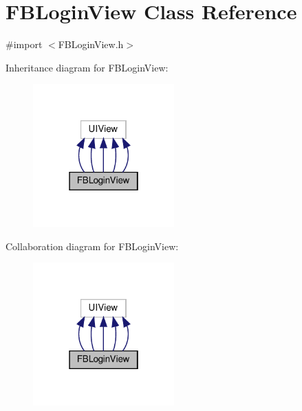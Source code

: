 \hypertarget{interfaceFBLoginView}{}\section{F\+B\+Login\+View Class Reference}
\label{interfaceFBLoginView}


{\ttfamily \#import $<$F\+B\+Login\+View.\+h$>$}



Inheritance diagram for F\+B\+Login\+View\+:
\nopagebreak
\begin{figure}[H]
\begin{center}
\leavevmode
\includegraphics[width=154pt]{interfaceFBLoginView__inherit__graph}
\end{center}
\end{figure}


Collaboration diagram for F\+B\+Login\+View\+:
\nopagebreak
\begin{figure}[H]
\begin{center}
\leavevmode
\includegraphics[width=154pt]{interfaceFBLoginView__coll__graph}
\end{center}
\end{figure}
